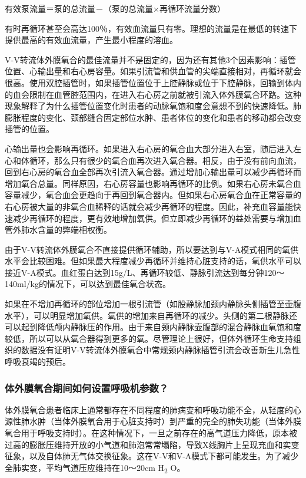 有效泵流量＝泵的总流量－（泵的总流量×再循环流量分数）

有时再循环甚至会高达100％，有效血流量只有零。理想的流量是在最低的转速下提供最高的有效血流量，产生最小程度的溶血。

V-V转流体外膜氧合的最佳流量并不是固定的，因为还有其他3个因素影响：插管位置、心输出量和右心房容量。如果引流管和供血管的尖端直接相对，再循环就会很高。使用双腔插管时，如果插管位置位于上腔静脉或位于下腔静脉，回输到体内的血会限制在血管腔范围内，在进入右心房之前就被引流入体外膜氧合环路。这种现象解释了为什么插管位置变化时患者的动脉氧饱和度会意想不到的快速降低。肺膨胀程度的变化、颈部缝合固定部位水肿、患者体位的变化和患者的移动都会改变插管的位置。

心输出量也会影响再循环。如果进入右心房的氧合血大部分进入右室，随后进入左心和体循环，那么只有很少的氧合血再次进入氧合器。相反，由于没有前向血流，回到右心房的氧合血全部再次引流入氧合器。通过增加心输出量可以减少再循环而增加氧合总量。同样原因，右心房容量也影响再循环的比例。如果右心房未氧合血容量减少，氧合血会更趋向于再回到氧合器内。但如果右心房氧合血在正常容量的右心房被大量的非氧合血稀释的话就会减少再循环的程度。因此，补充血容量能快速减少再循环的程度，更有效地增加氧供。但立即减少再循环的益处需要与增加血管外肺水含量的弊端相权衡。

由于V-V转流体外膜氧合不直接提供循环辅助，所以要达到与V-A模式相同的氧供水平会比较困难。但如果最大程度减少再循环并维持心脏支持的话，氧供水平可以接近V-A模式。血红蛋白达到15g/L、再循环较低、静脉引流达到每分钟120～140ml/kg的情况下，可以达到最佳氧合状态。

如果在不增加再循环的部位增加一根引流管（如股静脉加颈内静脉头侧插管至壶腹水平），可以明显增加氧供。氧供的增加来自再循环的减少。头侧的第二根静脉还可以起到降低颅内静脉压的作用。由于来自颈内静脉壶腹部的混合静脉血氧饱和度较低，所以可以从氧合器得到更多的氧。尽管理论上很好，但体外循环生命支持组织的数据没有证明V-V转流体外膜氧合中常规颈内静脉插管引流会改善新生儿急性呼吸衰竭的预后。

\subsubsection{体外膜氧合期间如何设置呼吸机参数？}

体外膜氧合患者临床上通常都存在不同程度的肺病变和呼吸功能不全，从轻度的心源性肺水肿（当体外膜氧合用于心脏支持时）到严重的完全的肺失功能（当体外膜氧合用于呼吸支持时）。在这种情况下，一旦之前存在的高气道压力降低，原本被过高的膨胀压维持开放的小气道和肺泡常常塌陷，导致X线胸片上呈现充血和实变征象，以及自体肺无气体交换征象。这在V-V和V-A模式下都可能发生。为了减少全肺实变，平均气道压应维持在10～20cm
H\textsubscript{2} O。

